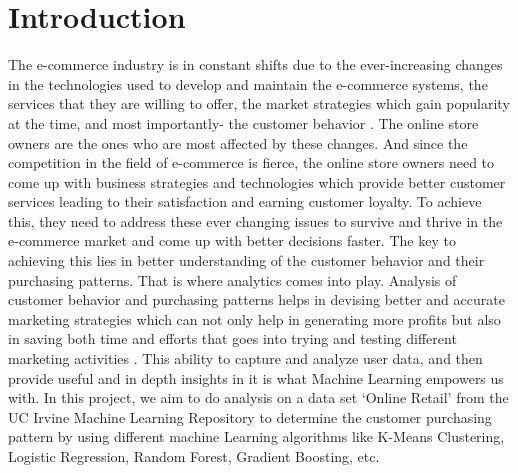 \section{Introduction}
The e-commerce industry is in constant shifts due to the ever-increasing changes in the technologies used to develop and maintain the e-commerce systems, the services that they are willing to offer, the market strategies which gain popularity at the time, and most importantly-  the customer behavior \cite{link1}. The online store owners are the ones who are most affected by these changes. And since the competition in the field of e-commerce is fierce, the online store owners need to come up with business strategies and technologies which provide better customer services leading to their satisfaction and earning customer loyalty. To achieve this, they need to address these ever changing issues to survive and thrive in the e-commerce market and come up with better decisions faster. The key to achieving this lies in better understanding of the customer behavior and their purchasing patterns. That is where analytics comes into play. Analysis of customer behavior and purchasing patterns helps in devising better and accurate marketing strategies which can not only help in generating more profits but also in saving both time and efforts that goes into trying and testing different marketing activities \cite{link1}. This ability to capture and analyze user data, and then provide useful and in depth insights in it is what Machine Learning empowers us with. In this project, we aim to do analysis on a data set `Online Retail' from the UC Irvine Machine Learning Repository to determine the customer purchasing pattern by using different machine Learning algorithms like K-Means Clustering, Logistic Regression, Random Forest, Gradient Boosting, etc.

